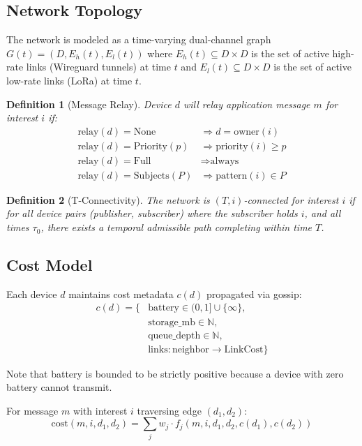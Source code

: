 \documentclass[journal]{IEEEtran}
\newtheorem{definition}{Definition}
\begin{document}
\subsection{Network Topology}

The network is modeled as a time-varying dual-channel graph $G(t) = (D, E_h(t), E_l(t))$ where $E_h(t) \subseteq D \times D$ is the set of active high-rate links (Wireguard tunnels) at time $t$ and $E_l(t) \subseteq D \times D$ is the set of active low-rate links (LoRa) at time $t$.

\begin{definition}[Message Relay]
Device $d$ will relay application message $m$ for interest $i$ if:
\begin{align*}
\text{relay}(d) = \text{None} &\Rightarrow d = \text{owner}(i) \\
\text{relay}(d) = \text{Priority}(p) &\Rightarrow \text{priority}(i) \geq p \\
\text{relay}(d) = \text{Full} &\Rightarrow \text{always} \\
\text{relay}(d) = \text{Subjects}(P) &\Rightarrow \text{pattern}(i) \in P
\end{align*}
\end{definition}

\begin{definition}[T-Connectivity]
The network is $(T, i)$-connected for interest $i$ if for all device pairs (publisher, subscriber) where the subscriber holds $i$, and all times $\tau_0$, there exists a temporal admissible path completing within time $T$.
\end{definition}

\subsection{Cost Model}

Each device $d$ maintains cost metadata $c(d)$ propagated via gossip:
\begin{align*}
c(d) = \{&\text{battery} \in (0, 1] \cup \{\infty\}, \\
&\text{storage\_mb} \in \mathbb{N}, \\
&\text{queue\_depth} \in \mathbb{N}, \\
&\text{links} : \text{neighbor} \to \text{LinkCost}\}
\end{align*}

Note that battery is bounded to be strictly positive because a device with zero battery cannot transmit.

For message $m$ with interest $i$ traversing edge $(d_1, d_2)$:
\begin{equation}
\text{cost}(m, i, d_1, d_2) = \sum_j w_j \cdot f_j(m, i, d_1, d_2, c(d_1), c(d_2))
\end{equation}
\end{document}
